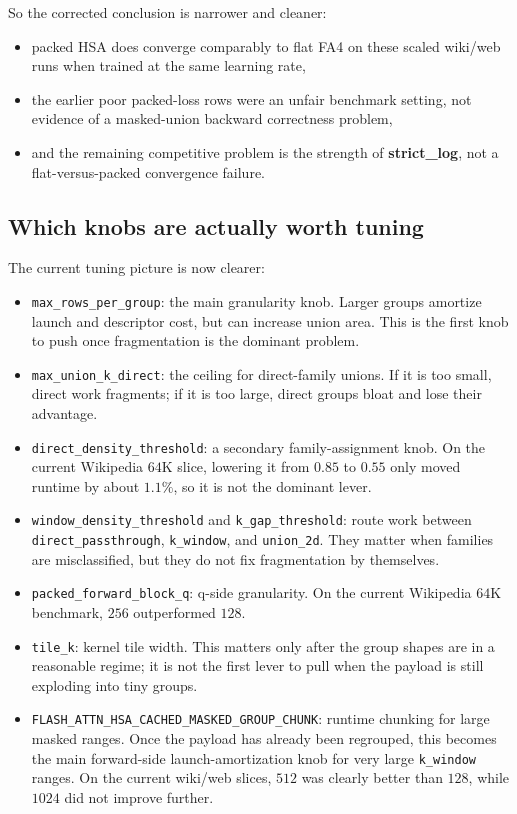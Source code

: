 \documentclass[11pt]{article}
\begin{document}
So the corrected conclusion is narrower and cleaner:
\begin{itemize}[leftmargin=1.5em]
    \item packed HSA does converge comparably to flat FA4 on these scaled
    wiki/web runs when trained at the same learning rate,
    \item the earlier poor packed-loss rows were an unfair benchmark setting,
    not evidence of a masked-union backward correctness problem,
    \item and the remaining competitive problem is the strength of
    \textbf{strict\_log}, not a flat-versus-packed convergence failure.
\end{itemize}

\subsection{Which knobs are actually worth tuning}

The current tuning picture is now clearer:
\begin{itemize}[leftmargin=1.5em]
    \item \texttt{max\_rows\_per\_group}: the main granularity knob. Larger
    groups amortize launch and descriptor cost, but can increase union area.
    This is the first knob to push once fragmentation is the dominant problem.
    \item \texttt{max\_union\_k\_direct}: the ceiling for direct-family unions.
    If it is too small, direct work fragments; if it is too large, direct
    groups bloat and lose their advantage.
    \item \texttt{direct\_density\_threshold}: a secondary family-assignment
    knob. On the current Wikipedia \(64\)K slice, lowering it from \(0.85\) to
    \(0.55\) only moved runtime by about \(1.1\%\), so it is not the dominant
    lever.
    \item \texttt{window\_density\_threshold} and
    \texttt{k\_gap\_threshold}: route work between
    \texttt{direct\_passthrough}, \texttt{k\_window}, and \texttt{union\_2d}.
    They matter when families are misclassified, but they do not fix
    fragmentation by themselves.
    \item \texttt{packed\_forward\_block\_q}: q-side granularity. On the
    current Wikipedia \(64\)K benchmark, \(256\) outperformed \(128\).
    \item \texttt{tile\_k}: kernel tile width. This matters only after the
    group shapes are in a reasonable regime; it is not the first lever to pull
    when the payload is still exploding into tiny groups.
    \item \texttt{FLASH\_ATTN\_HSA\_CACHED\_MASKED\_GROUP\_CHUNK}: runtime
    chunking for large masked ranges. Once the payload has already been
    regrouped, this becomes the main forward-side launch-amortization knob for
    very large \texttt{k\_window} ranges. On the current wiki/web slices,
    \(512\) was clearly better than \(128\), while \(1024\) did not improve
    further.
\end{itemize}
\end{document}
